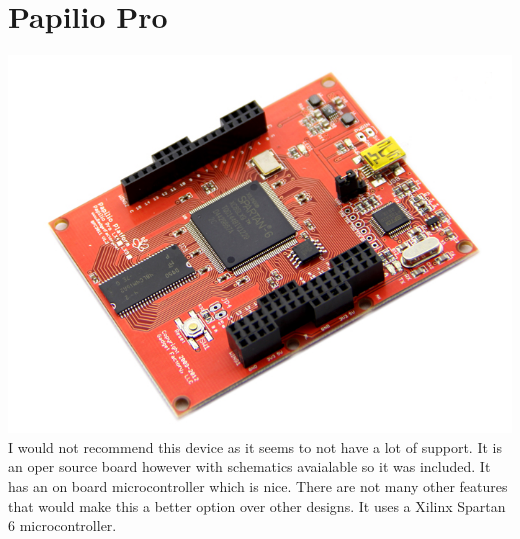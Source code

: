 \documentclass{article}
\begin{document}
	\newpage
	\section{Papilio Pro}
	\includegraphics{ppro}
	I would not recommend this device as it seems to not have a lot of support. It is an oper source board
	however with schematics avaialable so it was included. It has an on board microcontroller which is nice.
	There are not many other features that would make this a better option over other designs. It uses a
	Xilinx Spartan 6 microcontroller. 

	\newpage
\end{document}
